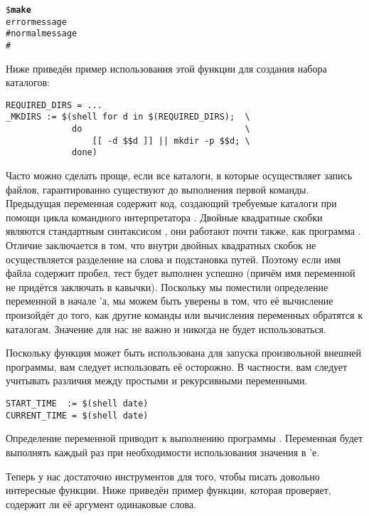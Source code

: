 \begin{description}
{\footnotesize
\begin{alltt}
\${} \textbf{make}
error message
# normal message
#
\end{alltt}
}

Ниже приведён пример использования этой функции для создания набора
каталогов:

{\footnotesize
\begin{verbatim}
REQUIRED_DIRS = ...
_MKDIRS := $(shell for d in $(REQUIRED_DIRS);  \
             do                                \
                 [[ -d $$d ]] || mkdir -p $$d; \
             done)
\end{verbatim}
}

Часто \Makefile{} можно сделать проще, если все каталоги, в которые
\GNUmake{} осуществляет запись файлов, гарантированно существуют до
выполнения первой команды. Предыдущая переменная содержит код,
создающий требуемые каталоги при помощи цикла \command{for} командного
интерпретатора \utility{bash}. Двойные квадратные скобки являются
стандартным синтаксисом \utility{bash}, они работают почти также, как
программа \utility{test}. Отличие заключается в том, что внутри
двойных квадратных скобок не осуществляется разделение на слова и
подстановка путей. Поэтому если имя файла содержит пробел, тест будет
выполнен успешно (причём имя переменной не придётся заключать в
кавычки). Поскольку мы поместили определение переменной
 в начале \Makefile{}'а, мы можем быть уверены в
том, что её вычисление произойдёт до того, как другие команды или
вычисления переменных обратятся к каталогам. Значение
\variable{\_MKDIRS} для нас не важно и никогда не будет
использоваться.

Поскольку функция \function{shell} может быть использована для запуска
произвольной внешней программы, вам следует использовать её осторожно.
В частности, вам следует учитывать различия между простыми и
рекурсивными переменными.

{\footnotesize
\begin{verbatim}
START_TIME  := $(shell date)
CURRENT_TIME = $(shell date)
\end{verbatim}
}

Определение переменной  приводит к выполнению
программы . Переменная  будет
выполнять  каждый раз при необходимости использования
значения в \Makefile{}'е.
\end{description}

Теперь у нас достаточно инструментов для того, чтобы писать довольно
интересные функции. Ниже приведён пример функции, которая проверяет,
содержит ли её аргумент одинаковые слова.

